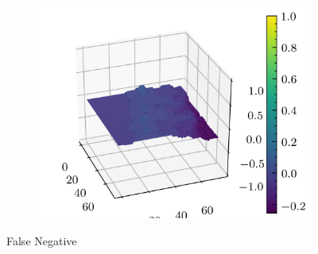 \documentclass[../document.tex]{subfiles}
\begin{document}
\begin{figure}[H]
\begin{subfigure}[b]{0.19\textwidth}
        \includegraphics[width=\linewidth]{../img/5/quarry/false_negative/patch-3d-4.png}
    \end{subfigure}  

\caption{False Negative}    
\end{figure}
\end{document}
